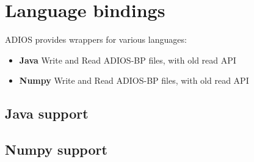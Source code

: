 \chapter{Language bindings}

ADIOS provides wrappers for various languages:

\begin{itemize}
\item{\bf Java}  Write and Read ADIOS-BP files, with old read API
\item{\bf Numpy} Write and Read ADIOS-BP files, with old read API
\end{itemize}

\section{Java support}
\label{section-bindings-java}


\section{Numpy support}
\label{section-bindings-numpy}


